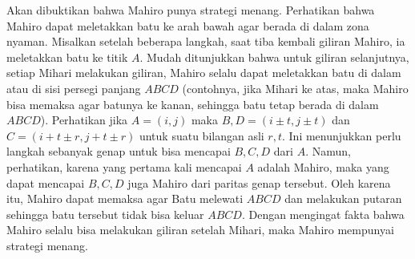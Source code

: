 \documentclass[11pt]{scrartcl}
\begin{document}
\begin{soaljawab}
\begin{solusi}
        Akan dibuktikan bahwa Mahiro punya strategi menang. Perhatikan bahwa Mahiro dapat meletakkan batu ke arah bawah agar berada di dalam zona nyaman. Misalkan setelah beberapa langkah, saat tiba kembali giliran Mahiro, ia meletakkan batu ke titik $A$. Mudah ditunjukkan bahwa untuk giliran selanjutnya, setiap  Mihari melakukan giliran, Mahiro selalu dapat meletakkan batu di dalam atau di sisi persegi panjang $ABCD$ (contohnya, jika Mihari ke atas, maka Mahiro bisa memaksa agar batunya ke kanan, sehingga batu tetap berada di dalam $ABCD$). Perhatikan jika $A=(i,j)$ maka $B,D = (i\pm t, j \pm t)$ dan $C=(i + t  \pm r, j + t \pm r)$ untuk suatu bilangan asli $r,t$. Ini menunjukkan perlu langkah sebanyak genap untuk bisa mencapai $B,C,D$ dari $A$. Namun, perhatikan, karena yang pertama kali mencapai $A$ adalah Mahiro, maka yang dapat mencapai $B,C,D$ juga Mahiro dari paritas genap tersebut. Oleh karena itu, Mahiro dapat memaksa agar Batu melewati $ABCD$ dan melakukan putaran sehingga batu tersebut tidak bisa keluar $ABCD$. Dengan mengingat fakta bahwa Mahiro selalu bisa melakukan giliran setelah Mihari, maka Mahiro mempunyai strategi menang.
    \end{solusi}
\end{soaljawab}
\end{document}
